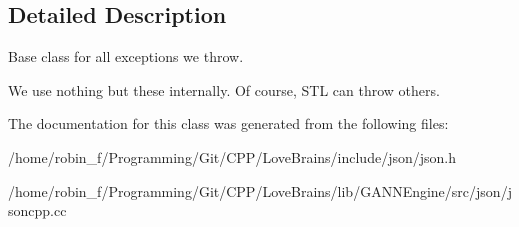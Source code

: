 \subsection{Detailed Description}
Base class for all exceptions we throw.

We use nothing but these internally. Of course, S\+T\+L can throw others. 

The documentation for this class was generated from the following files\+:\begin{DoxyCompactItemize}
\item 
/home/robin\+\_\+f/\+Programming/\+Git/\+C\+P\+P/\+Love\+Brains/include/json/json.\+h\item 
/home/robin\+\_\+f/\+Programming/\+Git/\+C\+P\+P/\+Love\+Brains/lib/\+G\+A\+N\+N\+Engine/src/json/jsoncpp.\+cc\end{DoxyCompactItemize}
